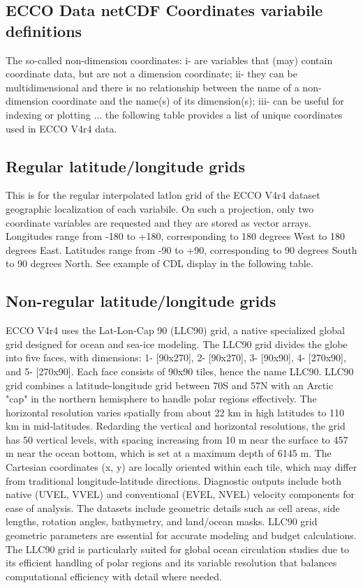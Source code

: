 \subsection{ECCO Data netCDF Coordinates variabile definitions}
The so-called non-dimension coordinates: i- are variables that (may) contain coordinate data, but are not a dimension coordinate; ii- they can be multidimensional and there is no relationship between the name of a non-dimension coordinate and the name(s) of its dimension(s); iii- can be useful for indexing or plotting ... the following table provides a list of unique coordinates used in ECCO V4r4 data.


\subsection*{Regular latitude/longitude grids}
\par This is for the regular interpolated latlon grid of the ECCO V4r4 dataset geographic localization of each variabile. On such a projection, only two coordinate variables are requested and they are stored as vector arrays. Longitudes range from -180 to +180, corresponding to 180 degrees West to 180 degrees East. Latitudes range from -90 to +90, corresponding to 90 degrees South to 90 degrees North. See example of CDL display in the following table.

\subsection*{Non-regular latitude/longitude grids}
\par ECCO V4r4 uses the Lat-Lon-Cap 90 (LLC90) grid, a native specialized global grid designed for ocean and sea-ice modeling. The LLC90 grid divides the globe into five faces, with dimensions: 1- [90x270], 2- [90x270], 3- [90x90], 4- [270x90], and 5- [270x90]. Each face consists of 90x90 tiles, hence the name LLC90. LLC90 grid combines a latitude-longitude grid between 70\textdegree S and 57\textdegree N with an Arctic "cap" in the northern hemisphere to handle polar regions effectively. The horizontal resolution varies spatially from about 22 km in high latitudes to 110 km in mid-latitudes. Redarding the vertical and horizontal resolutions, the grid has 50 vertical levels, with spacing increasing from 10 m near the surface to 457 m near the ocean bottom, which is set at a maximum depth of 6145 m. The Cartesian coordinates (x, y) are locally oriented within each tile, which may differ from traditional longitude-latitude directions. Diagnostic outputs include both native (UVEL, VVEL) and conventional (EVEL, NVEL) velocity components for ease of analysis. The datasets include geometric details such as cell areas, side lengths, rotation angles, bathymetry, and land/ocean masks. LLC90 grid geometric parameters are essential for accurate modeling and budget calculations. The LLC90 grid is particularly suited for global ocean circulation studies due to its efficient handling of polar regions and its variable resolution that balances computational efficiency with detail where needed.

